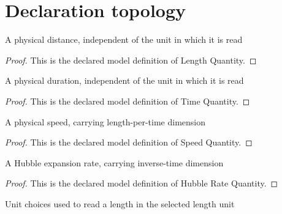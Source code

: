 \section{Declaration topology}
\begin{definition}
  \label{def:physics:phyx-mini-0923:phyxminiproblems-problemphyxmini0923-lengthquantity}
  A physical distance, independent of the unit in which it is read
\end{definition}
\begin{proof}
  This is the declared model definition of Length Quantity.
\end{proof}
\begin{definition}
  \label{def:physics:phyx-mini-0923:phyxminiproblems-problemphyxmini0923-timequantity}
  A physical duration, independent of the unit in which it is read
\end{definition}
\begin{proof}
  This is the declared model definition of Time Quantity.
\end{proof}
\begin{definition}
  \label{def:physics:phyx-mini-0923:phyxminiproblems-problemphyxmini0923-speedquantity}
  A physical speed, carrying length-per-time dimension
\end{definition}
\begin{proof}
  This is the declared model definition of Speed Quantity.
\end{proof}
\begin{definition}
  \label{def:physics:phyx-mini-0923:phyxminiproblems-problemphyxmini0923-hubbleratequantity}
  A Hubble expansion rate, carrying inverse-time dimension
\end{definition}
\begin{proof}
  This is the declared model definition of Hubble Rate Quantity.
\end{proof}
\begin{definition}
  \label{def:physics:phyx-mini-0923:phyxminiproblems-problemphyxmini0923-unitswithlength}
  Unit choices used to read a length in the selected length unit
\end{definition}
